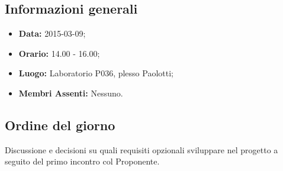 \subsection{Informazioni generali}
\begin{itemize}
	\item \textbf{Data:} 2015-03-09;
	\item \textbf{Orario:} 14.00 - 16.00;
	\item \textbf{Luogo:} Laboratorio P036, plesso Paolotti;
	\item \textbf{Membri Assenti:} Nessuno.
\end{itemize}

\subsection{Ordine del giorno}
Discussione e decisioni su quali requisiti opzionali sviluppare nel progetto \PROGETTO{} a seguito del primo incontro col Proponente.
